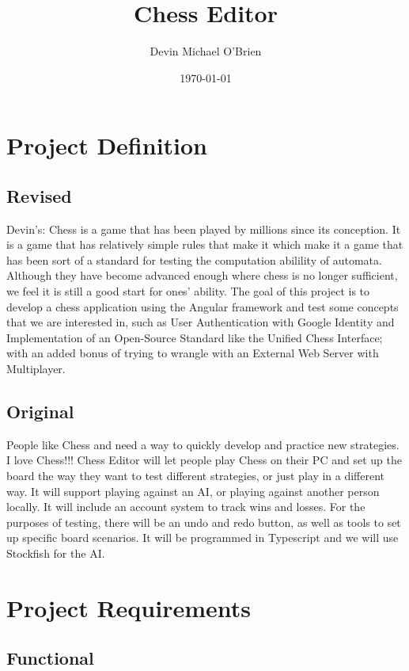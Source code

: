 \documentclass[11pt]{article}
\author{Devin Michael O'Brien}
\date{\today}
\title{Chess Editor}
\begin{document}
\maketitle
\tableofcontents

\section{Project Definition}
\label{sec:org83eaefe}
\subsection{Revised}
\label{sec:org83ee185}
Devin's:
Chess is a game that has been played by millions since its
conception. It is a game that has relatively simple rules that make it
which make it a game that has been sort of a standard for testing the
computation abilility of automata. Although they have become advanced
enough where chess is no longer sufficient, we feel it is still a good
start for ones' ability. The goal of this project is to develop a
chess application using the Angular framework and test some concepts
that we are interested in, such as User Authentication with Google
Identity and Implementation of an Open-Source Standard like the
Unified Chess Interface; with an added bonus of trying to wrangle with
an External Web Server with Multiplayer.

\subsection{Original}
\label{sec:org3366cab}
People like Chess and need a way to quickly develop and practice new strategies. I love
Chess!!! Chess Editor will let people play Chess on their PC and set up the board the
way they want to test different strategies, or just play in a different way. It will support
playing against an AI, or playing against another person locally. It will include an account
system to track wins and losses. For the purposes of testing, there will be an undo and
redo button, as well as tools to set up specific board scenarios. It will be programmed in
Typescript and we will use Stockfish for the AI.


\section{Project Requirements}
\label{sec:org10e9d36}
\subsection{Functional}
\label{sec:org69c7430}
\end{document}
